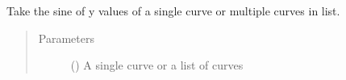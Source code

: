 \documentclass[letterpaper,10pt,english]{sphinxmanual}
\begin{document}

\begin{fulllineitems}
\label{\detokenize{pydv:pydvpy.sin}}
Take the sine of y values of a single curve or multiple curves in list.

\begin{sphinxVerbatim}[commandchars=\\\{\}]
  
\end{sphinxVerbatim}

\begin{sphinxVerbatim}[commandchars=\\\{\}]
\end{sphinxVerbatim}
\begin{quote}\begin{description}
\item[{Parameters}] \leavevmode
{} () \textendash{} A single curve or a list of curves

\end{description}\end{quote}

\end{fulllineitems}

\end{document}
